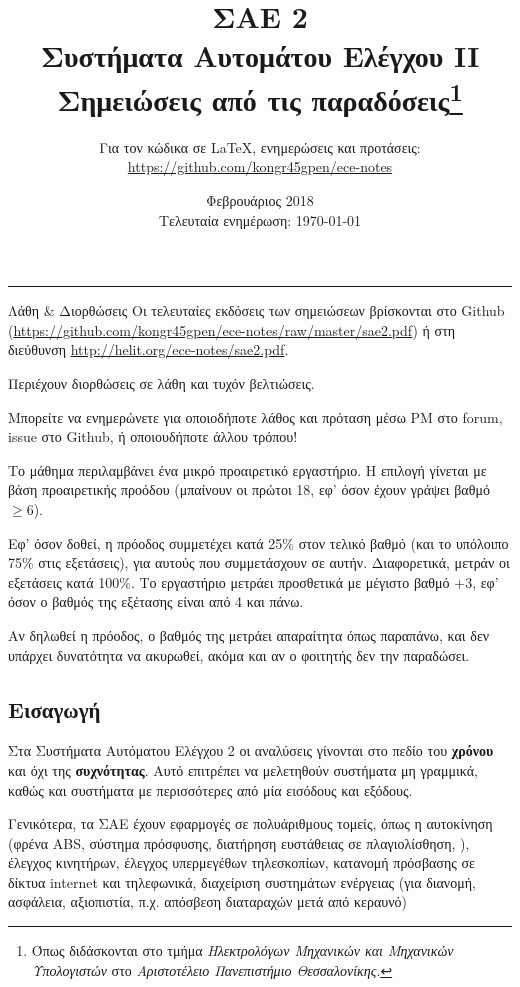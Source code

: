 \documentclass[11pt,a4paper,notitlepage,fleqn,final]{article}
\title{ΣΑΕ 2
	\\
	{ 
		\normalsize Συστήματα Αυτομάτου Ελέγχου II
		\\
		\normalsize Σημειώσεις από τις παραδόσεις\footnote{Όπως διδάσκονται στο τμήμα \textit{Ηλεκτρολόγων Μηχανικών και Μηχανικών Υπολογιστών} στο \textit{Αριστοτέλειο Πανεπιστήμιο Θεσσαλονίκης}.}
	}}
\date{Φεβρουάριος 2018
	\\
	{ 
		\small Τελευταία ενημέρωση: \today
	}
}
\author{
	Για τον κώδικα σε \LaTeX, ενημερώσεις και προτάσεις:
	\\
	\url{https://github.com/kongr45gpen/ece-notes}}
\begin{document}
\maketitle

\hrule
\vspace{50pt}

\begin{infobox}{Λάθη \& Διορθώσεις}
	Οι τελευταίες εκδόσεις των σημειώσεων βρίσκονται στο Github
	(\url{https://github.com/kongr45gpen/ece-notes/raw/master/sae2.pdf}) ή
	στη διεύθυνση \url{http://helit.org/ece-notes/sae2.pdf}.
	
	Περιέχουν διορθώσεις σε λάθη και τυχόν βελτιώσεις.
	
	\tcblower
	
	Μπορείτε να ενημερώνετε για οποιοδήποτε λάθος και πρόταση
	μέσω PM στο forum, issue στο Github, ή οποιουδήποτε άλλου τρόπου!
\end{infobox}
	
Το μάθημα περιλαμβάνει ένα μικρό προαιρετικό εργαστήριο. Η επιλογή γίνεται με βάση
προαιρετικής προόδου (μπαίνουν οι πρώτοι 18, εφ' όσον έχουν γράψει βαθμό \( \geq 6 \)).

Εφ' όσον δοθεί, η πρόοδος συμμετέχει κατά 25\% στον τελικό βαθμό
(και το υπόλοιπο 75\% στις εξετάσεις), για αυτούς που συμμετάσχουν
σε αυτήν. Διαφορετικά, μετράν οι εξετάσεις κατά 100\%. Το εργαστήριο μετράει προσθετικά
με μέγιστο βαθμό \( +3 \), εφ' όσον ο βαθμός της εξέτασης είναι από 4 και πάνω.

Αν δηλωθεί η πρόοδος, ο βαθμός της μετράει απαραίτητα όπως παραπάνω, και δεν υπάρχει δυνατότητα να
ακυρωθεί, ακόμα και αν ο φοιτητής δεν την παραδώσει.

\newpage

\tableofcontents

\newpage
{}
\subsection{Εισαγωγή}
Στα Συστήματα Αυτόματου Ελέγχου 2 οι αναλύσεις γίνονται στο πεδίο του \textbf{χρόνου}
και όχι της \textbf{συχνότητας}. Αυτό επιτρέπει να μελετηθούν συστήματα μη γραμμικά,
καθώς και συστήματα με περισσότερες από μία εισόδους και εξόδους.

Γενικότερα, τα ΣΑΕ έχουν εφαρμογές σε πολυάριθμους τομείς, όπως η αυτοκίνηση (φρένα
ABS, σύστημα πρόσφυσης, διατήρηση ευστάθειας σε πλαγιολίσθηση, \textellipsis), έλεγχος
κινητήρων, έλεγχος υπερμεγέθων τηλεσκοπίων, κατανομή πρόσβασης σε δίκτυα internet και
τηλεφωνικά, διαχείριση συστημάτων ενέργειας (για διανομή, ασφάλεια, αξιοπιστία, π.χ.
απόσβεση διαταραχών μετά από κεραυνό)\textellipsis
\end{document}
